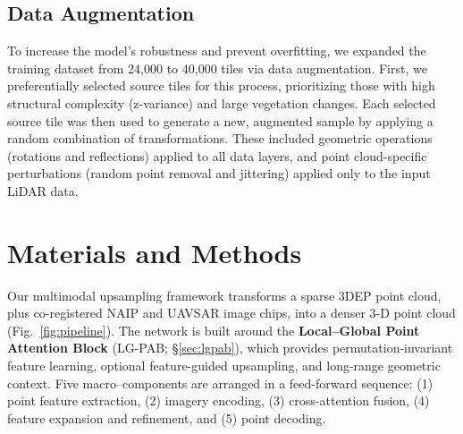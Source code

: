 \documentclass[preprints,article,accept,pdftex,moreauthors]{Definitions/mdpi}
\begin{document}
\subsection{Data Augmentation}
To increase the model's robustness and prevent overfitting, we expanded the training dataset from 24,000 to 40,000 tiles via data augmentation. First, we preferentially selected source tiles for this process, prioritizing those with high structural complexity (z-variance) and large vegetation changes. Each selected source tile was then used to generate a new, augmented sample by applying a random combination of transformations. These included geometric operations (rotations and reflections) applied to all data layers, and point cloud-specific perturbations (random point removal and jittering) applied only to the input LiDAR data.


\section{Materials and Methods}
Our multimodal upsampling framework transforms a sparse 3DEP point cloud, plus co-registered NAIP and UAVSAR image chips, into a denser 3-D point cloud (Fig.~\ref{fig:pipeline}).  
The network is built around the \textbf{Local–Global Point Attention Block} (LG-PAB; §\ref{sec:lgpab}), which provides permutation‐invariant feature learning, optional feature-guided upsampling, and long-range geometric context.  
Five macro–components are arranged in a feed-forward sequence:  
(1) point feature extraction, (2) imagery encoding, (3) cross-attention fusion, (4) feature expansion and refinement, and (5) point decoding.
\end{document}
